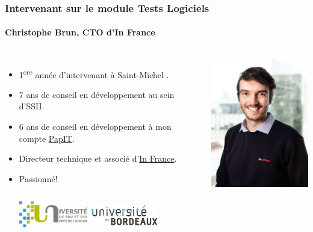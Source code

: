 \documentclass{beamer}
\begin{document}
    \begin{frame}
        \transdissolve
        \frametitle{Intervenant sur le module Tests Logiciels}
        \framesubtitle{Christophe Brun, CTO d'In France}

        \begin{columns}
            \begin{itemize}
                \item 1\textsuperscript{ere} année d’intervenant à Saint-Michel .

                \item 7 ans de conseil en développement au sein d’SSII.

                \item 6 ans de conseil en développement à mon compte \href{https://papit.fr}{PapIT}.

                \item Directeur technique et associé d’\href{https://in-france.fr}{In France}.

                \item Passionné!
                \bigbreak
                \begin{columns}
                    \centering
                    \includegraphics[width=3cm]{image/logo-uppa.png}
                    \centering
                    \includegraphics[width=3cm]{image/logo-universite-bordeaux.png}
                \end{columns}
            \end{itemize}
            \centering
            \includegraphics[width=5cm]{image/trombine-christophe.jpg}
        \end{columns}
    \end{frame}
\end{document}
